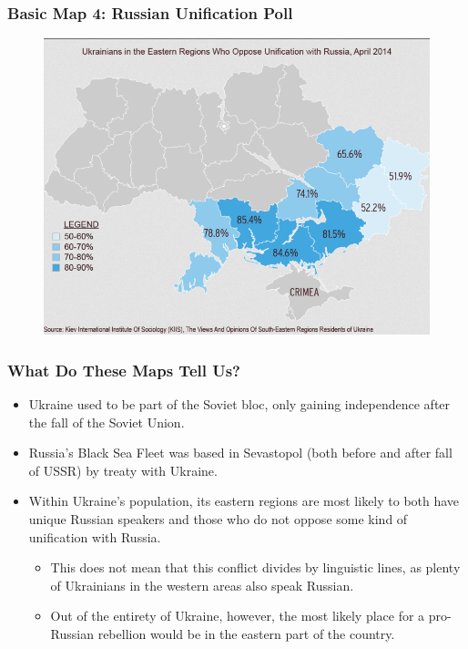 \documentclass[handout]{beamer}
\begin{document}
\begin{frame} 
	\frametitle{\LARGE{Basic Map 4: Russian Unification Poll}}
	\begin{figure}[ht!]
		\centering
		\includegraphics[width=\textwidth,height=0.9\textheight,keepaspectratio]{map4.png}
	\end{figure}
\end{frame}

\begin{frame} 
	\frametitle{\LARGE{What Do These Maps Tell Us?}}
	\begin{itemize}
		\item Ukraine used to be part of the Soviet bloc, only gaining independence after the fall of the Soviet Union. \pause
		\item Russia's Black Sea Fleet was based in Sevastopol (both before and after fall of USSR) by treaty with Ukraine. \pause
		\item Within Ukraine's population, its eastern regions are most likely to both have unique Russian speakers and those who do not oppose some kind of unification with Russia. \pause
		\begin{itemize}
			\item This does not mean that this conflict divides by linguistic lines, as plenty of Ukrainians in the western areas also speak Russian. \pause
			\item Out of the entirety of Ukraine, however, the most likely place for a pro-Russian rebellion would be in the eastern part of the country.
		\end{itemize}
	\end{itemize}
\end{frame}
\end{document}
